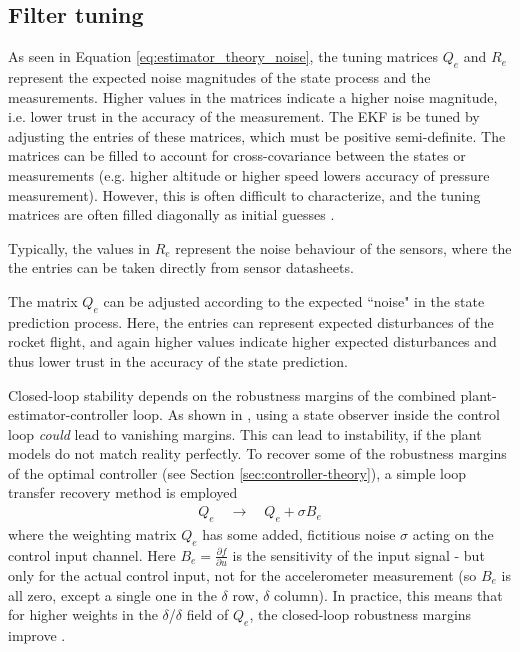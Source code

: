 \subsection{Filter tuning}
\label{sec:estimator-tuning}
As seen in Equation \ref{eq:estimator_theory_noise}, the tuning matrices $Q_e$ and $R_e$ represent the expected noise magnitudes of the state process and the measurements.
Higher values in the matrices indicate a higher noise magnitude, i.e. lower trust in the accuracy of the measurement.
The EKF is be tuned by adjusting the entries of these matrices, which must be positive semi-definite.
The matrices can be filled to account for cross-covariance between the states or measurements (e.g. higher altitude or higher speed lowers accuracy of pressure measurement).
However, this is often difficult to characterize, and the tuning matrices are often filled diagonally as initial guesses \cite{werner2021}.

Typically, the values in $R_e$ represent the noise behaviour of the sensors, where the the entries can be taken directly from sensor datasheets.

The matrix $Q_e$ can be adjusted according to the expected ``noise" in the state prediction process. 
Here, the entries can represent expected disturbances of the rocket flight, and again higher values indicate higher expected disturbances and thus lower trust in the accuracy of the state prediction.

Closed-loop stability depends on the robustness margins of the combined plant-estimator-controller loop.
As shown in \cite{doyle1978}, using a state observer inside the control loop \textit{could} lead to vanishing margins.
This can lead to instability, if the plant models do not match reality perfectly.
To recover some of the robustness margins of the optimal controller (see Section \ref{sec:controller-theory}), a simple loop transfer recovery method is employed \cite{werner2021}
\begin{align}
    Q_e \quad \to \quad Q_e + \sigma B_e
\end{align}
where the weighting matrix $Q_e$ has some added, fictitious noise $\sigma$ acting on the control input channel.
Here $B_e = \frac{\partial f}{\partial u}$ is the sensitivity of the input signal - but only for the actual control input, not for the accelerometer measurement (so $B_e$ is all zero, except a single one in the $\delta$ row, $\delta$ column).
In practice, this means that for higher weights in the $\delta$/$\delta$ field of $Q_e$, the closed-loop robustness margins improve \cite{werner2021}.


